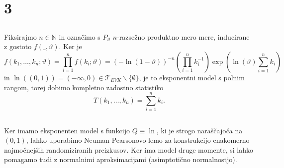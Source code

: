 \documentclass[ letterpaper, titlepage, fleqn]{article}
\newcommand{\N}{\mathbb N}
\newcommand{\T}{\mathscr T}
\begin{document}
\section{3}
\subsection{}
Fiksirajmo $n\in\N$ in označimo s $P_\vartheta$ $n$-razsežno produktno mero mere, inducirane z gostoto $f(\_, \vartheta)$. Ker je
\begin{equation*}
f(k_1, \dots, k_n; \vartheta) = \prod_{i=1}^n f(k_i; \vartheta) =  (-\ln(1-\vartheta))^{-n} \left(\prod_{i=1}^n k_i^{-1}\right) \exp\left(\ln(\vartheta) \sum_{i=1}^n k_i\right)
\end{equation*}
in $\ln((0,1))  = (-\infty, 0) \in \T_{EVK} \smallsetminus \{\emptyset\}$, je to eksponentni model s polnim rangom, 
torej dobimo kompletno zadostno statistiko 
$$T(k_1, \dots, k_n) = \sum_{i=1}^n k_i.$$

\subsection{}
Ker imamo eksponenten model s funkcijo $Q \equiv \ln$, ki je strogo naraščajoča na $(0,1)$, lahko uporabimo Neuman-Pearsonovo
lemo za konstrukcijo enakomerno najmočnejših randomiziranih preizkusov. 
Ker ima model druge momente, si lahko pomagamo tudi z normalnimi aproksimacijami (asimptotično normalnostjo).
\end{document}

